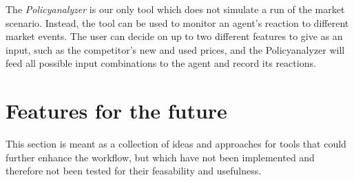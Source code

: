 The \emph{Policyanalyzer} is our only tool which does not simulate a run of the market scenario. Instead, the tool can be used to monitor an agent's reaction to different market events. The user can decide on up to two different features to give as an input, such as the competitor's new and used prices, and the Policyanalyzer will feed all possible input combinations to the agent and record its reactions. 

\section{Features for the future}

This section is meant as a collection of ideas and approaches for tools that could further enhance the workflow, but which have not been implemented and therefore not been tested for their feasability and usefulness.